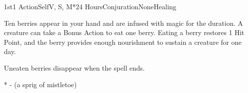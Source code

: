 \begin{Spell}{1st}{1 Action}{Self}{V, S, M*}{24 Hours}{Conjuration}{None}{Healing}

Ten berries appear in your hand and are infused with magic for the duration. A creature can take a Bonus Action to eat one berry. Eating a berry restores 1 Hit Point, and the berry provides enough nourishment to sustain a creature for one day.

Uneaten berries disappear when the spell ends.

* - (a sprig of mistletoe)
\end{Spell}


